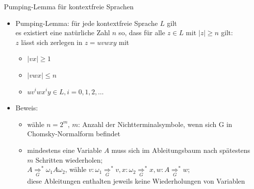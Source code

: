 \begin{frame}{Pumping-Lemma für kontextfreie Sprachen}
	\begin{itemize}
		\item Pumping-Lemma: für jede kontextfreie Sprache $L$ gilt\\
		es existiert eine natürliche Zahl $n$ so, dass für alle $z \in L$ mit $|z|\geq n$ gilt:\\
		$z$ lässt sich zerlegen in $z=uvwxy$ mit
		\begin{itemize}
			\item $|vx|\geq 1$
			\item $|vwx| \leq n$
			\item $uv^iwx^iy \in L, i=0, 1, 2, \ldots$
		\end{itemize}
		\item Beweis:
		\begin{itemize}
			\item wähle $n=2^m$, $m$: Anzahl der Nichtterminalsymbole, wenn sich G in Chomsky-Normalform befindet
			\item mindestens eine Variable $A$ muss sich im Ableitungsbaum nach spätestens $m$ Schritten wiederholen;\\
			$A\underset{G}{\Rightarrow}^*\omega_1 A \omega_2$, wähle $v: \omega_1 \underset{G}{\Rightarrow}^* v, x: \omega_2 \underset{G}{\Rightarrow}^* x, w: A \underset{G}{\Rightarrow}^* w$;\\
			diese Ableitungen enthalten jeweils keine Wiederholungen von Variablen
		\end{itemize}
	\end{itemize}
\end{frame}


